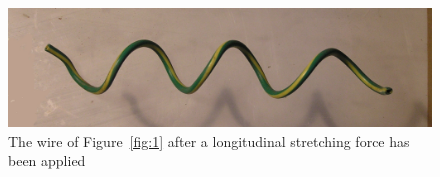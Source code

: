 %

\begin{figure}[!h]
  \centering
  \includegraphics[width=1.1\textwidth]{fig2p.jpg}
  \caption{The wire of Figure~\ref{fig:1} after a longitudinal stretching force has been applied} 
  \label{fig:2}
\end{figure}

%

